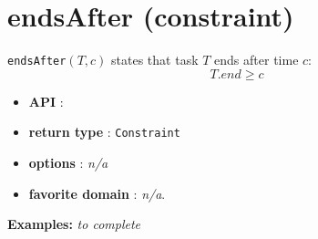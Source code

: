 \section{endsAfter (constraint)}\label{endsafter:endsafterconstraint}\hypertarget{endsafter:endsafterconstraint}{}
\begin{notedef}
  \texttt{endsAfter}$(T,c)$ states that task $T$ ends after time $c$:
  $$T.end \ge c$$
\end{notedef}

\begin{itemize}
	\item \textbf{API} :
	\item \textbf{return type} : \texttt{Constraint}
	\item \textbf{options} : \emph{n/a}
	\item \textbf{favorite domain} : \emph{n/a}.
\end{itemize}

\textbf{Examples:}
%
\emph{to complete}
